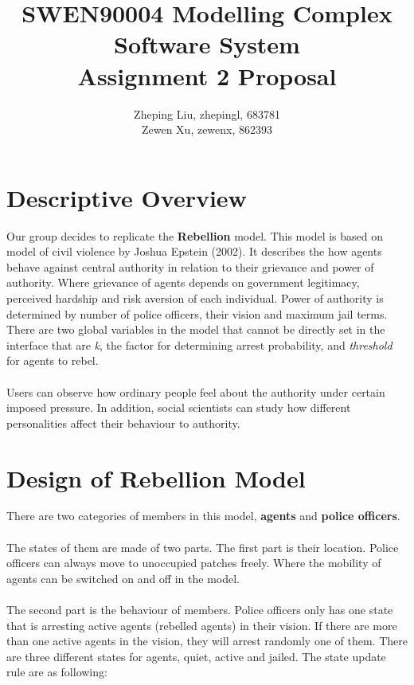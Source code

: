 \documentclass[UTF8,11pt]{article}
\title{SWEN90004 Modelling Complex Software System\\
      \textbf{Assignment 2 Proposal}}
\author{Zheping Liu, zhepingl, 683781\\
        Zewen Xu, zewenx, 862393}
\date{}
\begin{document}
    \maketitle
    \section{Descriptive Overview}
        Our group decides to replicate the \textbf{Rebellion} model.
        This model is based on model of civil violence by Joshua Epstein (2002).
        It describes the how agents behave against central authority in relation
        to their grievance and power of authority. Where grievance of agents
        depends on government legitimacy, perceived hardship and risk aversion 
        of each individual. Power of authority is determined by number of police
        officers, their vision and maximum jail terms. There are two global 
        variables in the model that cannot be directly set in the interface that 
        are \textit{k}, the factor for determining arrest probability, and 
        \textit{threshold} for agents to rebel.

        \paragraph{}
        Users can observe how ordinary people feel about the authority under
        certain imposed pressure. In addition, social scientists can study how
        different personalities affect their behaviour to authority.

    \section{Design of Rebellion Model}
        There are two categories of members in this model, \textbf{agents} and 
        \textbf{police officers}. 
        \paragraph{}
        The states of them are made of two parts.
        The first part is their location. Police officers can always move to 
        unoccupied patches freely. Where the mobility of agents can be switched
        on and off in the model.
        \paragraph{}
        The second part is the behaviour of members.
        Police officers only has one state that is arresting active agents 
        (rebelled agents) in their vision. If there are more than one active 
        agents in the vision, they will arrest randomly one of them. There are 
        three different states for agents, quiet, active and jailed. 
        The state update rule are as following:
\end{document}
